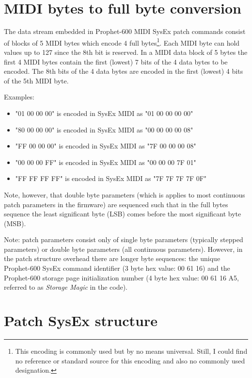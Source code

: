 \documentclass[landscape, 11pt, oneside]{report}
\begin{document}
\section{MIDI bytes to full byte conversion}\label{midibyteconversion}

The data stream embedded in Prophet-600 MIDI SysEx patch commands consist of blocks of 5 MIDI bytes which encode 4 full bytes\footnote{This encoding is commonly used but by no means universal. Still, I could find no reference or standard source for this encoding and also no commonly used designation.}. Each MIDI byte can hold values up to 127 since the 8th bit is reserved. In a MIDI data block of 5 bytes the first 4 MIDI bytes contain the first (lowest) 7 bits of the 4 data bytes to be encoded. The 8th bits of the 4 data bytes are encoded in the first (lowest) 4 bits of the 5th MIDI byte.   

Examples:

\begin{itemize}
  \item "01 00 00 00" is encoded in SysEx MIDI as "01 00 00 00 00"
  \item "80 00 00 00" is encoded in SysEx MIDI as "00 00 00 00 08"
  \item "FF 00 00 00" is encoded in SysEx MIDI as "7F 00 00 00 08"
  \item "00 00 00 FF" is encoded in SysEx MIDI as "00 00 00 7F 01"
  \item "FF FF FF FF" is encoded in SysEx MIDI as "7F 7F 7F 7F 0F"
\end{itemize}
 
Note, however, that double byte parameters (which is applies to most continuous patch parameters in the firmware) are sequenced such that in the full bytes sequence the least significant byte (LSB) comes before the most significant byte (MSB). 

Note: patch parameters  consist only of single byte parameters (typically stepped parameters) or double byte parameters (all continuous parameters). However, in the patch structure overhead there are longer byte sequences: the unique Prophet-600 SysEx command identifier (3 byte hex value: 00 61 16) and the Prophet-600 storage page initialization number (4 byte hex value: 00 61 16 A5, referred to as \textit{Storage Magic} in the code). 

\section{Patch SysEx structure}\label{sysexpatch}
\end{document}
